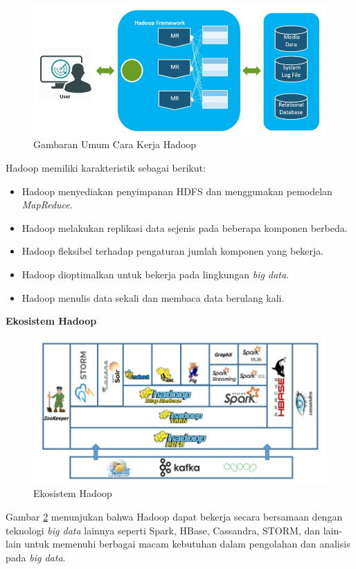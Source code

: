 \documentclass[a4paper,twoside]{article}
\begin{document}
\begin{enumerate}
\begin{figure}[H]
	\centering
	\includegraphics[scale=0.5]{hadoop_intro}
	\caption{Gambaran Umum Cara Kerja Hadoop}
	\label{fig:hadoop_intro}
\end{figure}

\noindent Hadoop memiliki karakteristik sebagai berikut:
\begin{itemize}
\item Hadoop menyediakan penyimpanan HDFS dan menggunakan pemodelan \textit{MapReduce}.
\item Hadoop melakukan replikasi data sejenis pada beberapa komponen berbeda. 
\item Hadoop fleksibel terhadap pengaturan jumlah komponen yang bekerja.
\item Hadoop dioptimalkan untuk bekerja pada lingkungan \textit{big data}.
\item Hadoop menulis data sekali dan membaca data berulang kali.

\end{itemize}

\textbf{Ekosistem Hadoop}

\begin{figure}[H]
	\centering
	\includegraphics[scale=0.55]{hadoop_ecosystem}
	\caption{Ekosistem Hadoop}
	\label{fig:hadoop_ecosystem}
\end{figure}
Gambar \ref{fig:hadoop_ecosystem} menunjukan bahwa Hadoop dapat bekerja secara bersamaan dengan teknologi \textit{big data} lainnya seperti Spark, HBase, Cassandra, STORM, dan lain-lain untuk memenuhi berbagai macam kebutuhan dalam pengolahan dan analisis pada \textit{big data}.


\end{enumerate}
\end{document}
